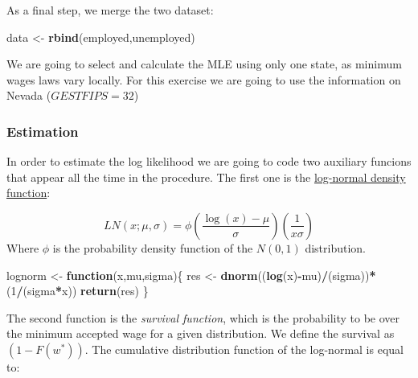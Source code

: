 \documentclass[]{book}
\newenvironment{Shaded}{\begin{snugshade}}{\end{snugshade}}
\newcommand{\KeywordTok}[1]{\textcolor[rgb]{0.13,0.29,0.53}{\textbf{#1}}}
\newcommand{\DecValTok}[1]{\textcolor[rgb]{0.00,0.00,0.81}{#1}}
\newcommand{\StringTok}[1]{\textcolor[rgb]{0.31,0.60,0.02}{#1}}
\newcommand{\ControlFlowTok}[1]{\textcolor[rgb]{0.13,0.29,0.53}{\textbf{#1}}}
\newcommand{\OperatorTok}[1]{\textcolor[rgb]{0.81,0.36,0.00}{\textbf{#1}}}
\newcommand{\NormalTok}[1]{#1}
\begin{document}
As a final step, we merge the two dataset:

\begin{Shaded}
\begin{Highlighting}[]
\NormalTok{data <-}\StringTok{ }\KeywordTok{rbind}\NormalTok{(employed,unemployed)}
\end{Highlighting}
\end{Shaded}

We are going to select and calculate the MLE using only one state, as
minimum wages laws vary locally. For this exercise we are going to use
the information on Nevada (\(GESTFIPS = 32\))

\begin{Shaded}
\end{Shaded}

\subsubsection{Estimation}\label{estimation-1}

In order to estimate the log likelihood we are going to code two
auxiliary funcions that appear all the time in the procedure. The first
one is the
\href{https://en.wikipedia.org/wiki/Log-normal_distribution}{log-normal
density function}:

\[LN \left(x; \mu, \sigma\right) = \phi \left( \frac{\log(x) - \mu}{\sigma} \right)(\frac{1}{x \sigma})\]
Where \(\phi\) is the probability density function of the \(N(0,1)\)
distribution.

\begin{Shaded}
\begin{Highlighting}[]
\NormalTok{lognorm <-}\StringTok{ }\ControlFlowTok{function}\NormalTok{(x,mu,sigma)\{}
\NormalTok{        res <-}\StringTok{ }\KeywordTok{dnorm}\NormalTok{((}\KeywordTok{log}\NormalTok{(x)}\OperatorTok{-}\NormalTok{mu)}\OperatorTok{/}\NormalTok{(sigma))}\OperatorTok{*}\NormalTok{(}\DecValTok{1}\OperatorTok{/}\NormalTok{(sigma}\OperatorTok{*}\NormalTok{x))}
        \KeywordTok{return}\NormalTok{(res)}
\NormalTok{\}}
\end{Highlighting}
\end{Shaded}

The second function is the \emph{survival function}, which is the
probability to be over the minimum accepted wage for a given
distribution. We define the survival as \((1- F(w^*))\). The cumulative
distribution function of the log-normal is equal to:
\end{document}
